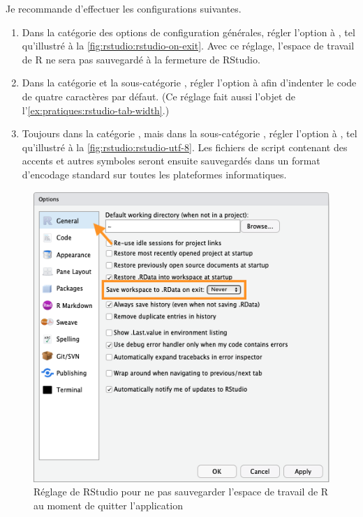 Je recommande d'effectuer les configurations suivantes.
\begin{enumerate}
\item Dans la catégorie des options de configuration générales, régler
  l'option  à , tel
  qu'illustré à la \autoref{fig:rstudio:rstudio-on-exit}. Avec ce
  réglage, l'espace de travail de R ne sera pas sauvegardé à la
  fermeture de RStudio.
\item Dans la catégorie  et la sous-catégorie
  , régler l'option  à  afin
  d'indenter le code de quatre caractères par défaut. (Ce réglage fait
  aussi l'objet de l'\autoref{ex:pratiques:rstudio-tab-width}.)
\item Toujours dans la catégorie , mais dans la
  sous-catégorie , régler l'option  à , tel qu'illustré à la
  \autoref{fig:rstudio:rstudio-utf-8}. Les fichiers de script
  contenant des accents et autres symboles seront ensuite sauvegardés
  dans un format d'encodage standard sur toutes les plateformes
  informatiques.
\end{enumerate}

\begin{figure}
  \centering
  \includegraphics{images/rstudio-on-exit}
  \caption{Réglage de RStudio pour ne pas sauvegarder l'espace
    de travail de R au moment de quitter l'application}
  \label{fig:rstudio:rstudio-on-exit}
\end{figure}

